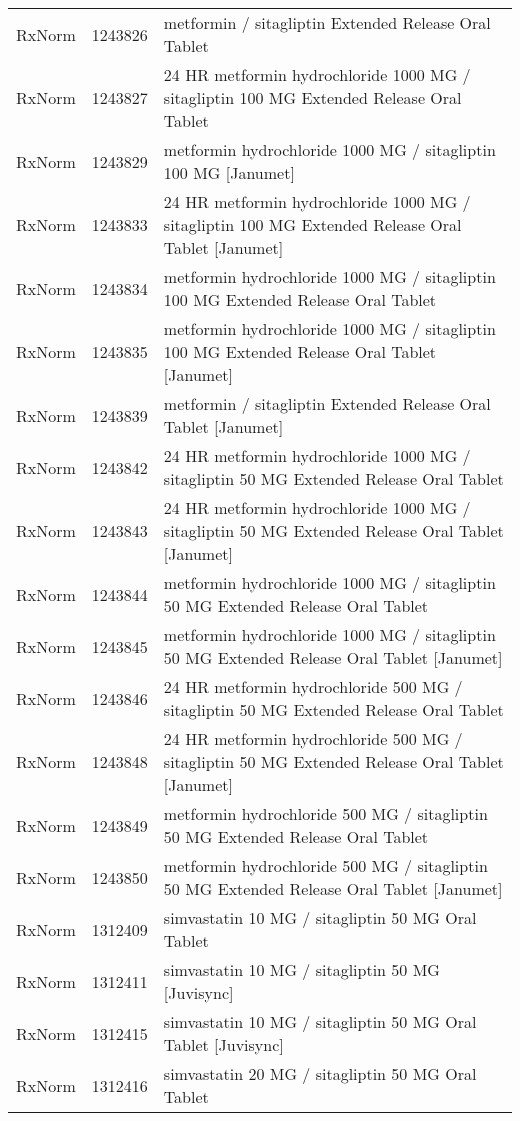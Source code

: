 \begin{longtable}{p{}p{}p{}}
  RxNorm & 1243826 & metformin / sitagliptin Extended Release Oral Tablet \\ 
  RxNorm & 1243827 & 24 HR metformin hydrochloride 1000 MG / sitagliptin 100 MG Extended Release Oral Tablet \\ 
  RxNorm & 1243829 & metformin hydrochloride 1000 MG / sitagliptin 100 MG [Janumet] \\ 
  RxNorm & 1243833 & 24 HR metformin hydrochloride 1000 MG / sitagliptin 100 MG Extended Release Oral Tablet [Janumet] \\ 
  RxNorm & 1243834 & metformin hydrochloride 1000 MG / sitagliptin 100 MG Extended Release Oral Tablet \\ 
  RxNorm & 1243835 & metformin hydrochloride 1000 MG / sitagliptin 100 MG Extended Release Oral Tablet [Janumet] \\ 
  RxNorm & 1243839 & metformin / sitagliptin Extended Release Oral Tablet [Janumet] \\ 
  RxNorm & 1243842 & 24 HR metformin hydrochloride 1000 MG / sitagliptin 50 MG Extended Release Oral Tablet \\ 
  RxNorm & 1243843 & 24 HR metformin hydrochloride 1000 MG / sitagliptin 50 MG Extended Release Oral Tablet [Janumet] \\ 
  RxNorm & 1243844 & metformin hydrochloride 1000 MG / sitagliptin 50 MG Extended Release Oral Tablet \\ 
  RxNorm & 1243845 & metformin hydrochloride 1000 MG / sitagliptin 50 MG Extended Release Oral Tablet [Janumet] \\ 
  RxNorm & 1243846 & 24 HR metformin hydrochloride 500 MG / sitagliptin 50 MG Extended Release Oral Tablet \\ 
  RxNorm & 1243848 & 24 HR metformin hydrochloride 500 MG / sitagliptin 50 MG Extended Release Oral Tablet [Janumet] \\ 
  RxNorm & 1243849 & metformin hydrochloride 500 MG / sitagliptin 50 MG Extended Release Oral Tablet \\ 
  RxNorm & 1243850 & metformin hydrochloride 500 MG / sitagliptin 50 MG Extended Release Oral Tablet [Janumet] \\ 
  RxNorm & 1312409 & simvastatin 10 MG / sitagliptin 50 MG Oral Tablet \\ 
  RxNorm & 1312411 & simvastatin 10 MG / sitagliptin 50 MG [Juvisync] \\ 
  RxNorm & 1312415 & simvastatin 10 MG / sitagliptin 50 MG Oral Tablet [Juvisync] \\ 
  RxNorm & 1312416 & simvastatin 20 MG / sitagliptin 50 MG Oral Tablet \\ 

\end{longtable}
